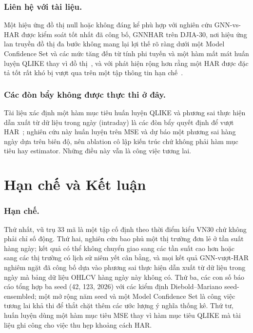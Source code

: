 \documentclass[runningheads]{llncs}
\begin{document}
\subsubsection{Liên hệ với tài liệu.}
Một hiệu ứng đồ thị null hoặc không đáng kể phù hợp với nghiên cứu GNN-vs-HAR được kiểm soát tốt nhất đã
công bố, GNNHAR trên DJIA-30, nơi hiệu ứng lan truyền đồ thị đa bước không mang lại lợi thế rõ ràng dưới
một Model Confidence Set và các mức tăng đến từ tính phi tuyến và một hàm mất mát huấn luyện QLIKE thay vì
đồ thị~\cite{zhang2025gnnhar}, và với phát hiện rộng hơn rằng một HAR được đặc tả tốt rất khó bị vượt qua
trên một tập thông tin hạn chế~\cite{audrino2025}.

\subsubsection{Các đòn bẩy không được thực thi ở đây.}
Tài liệu xác định một hàm mục tiêu huấn luyện QLIKE và phương sai thực hiện dẫn xuất từ dữ liệu trong ngày
(intraday) là các đòn bẩy quyết định để vượt HAR~\cite{zhang2025gnnhar}; nghiên cứu này huấn luyện trên
MSE và dự báo một phương sai hàng ngày dựa trên biên độ, nên ablation cô lập kiến trúc chứ không phải hàm
mục tiêu hay estimator. Những điều này vẫn là công việc tương lai.

\section{Hạn chế và Kết luận}
\label{sec:conclusion}

\subsubsection{Hạn chế.}
Thứ nhất, vũ trụ 33 mã là một tập cố định theo thời điểm kiểu VN30 chứ không phải chỉ số động. Thứ hai,
nghiên cứu bao phủ một thị trường đơn lẻ ở tần suất hàng ngày; kết quả có thể không chuyển giao sang các
tần suất cao hơn hoặc sang các thị trường có lịch sử niêm yết cân bằng, và mọi kết quả GNN-vượt-HAR
nghiêm ngặt đã công bố dựa vào phương sai thực hiện dẫn xuất từ dữ liệu trong ngày mà bảng dữ liệu OHLCV
hàng ngày này không có. Thứ ba, các con số báo cáo tổng hợp ba seed (42, 123, 2026) với các kiểm định
Diebold--Mariano seed-ensembled; một mở rộng năm seed và một Model Confidence Set là công việc tương lai
khả thi để thắt chặt thêm các ước lượng ý nghĩa thống kê. Thứ tư, huấn luyện dùng một hàm mục tiêu MSE
thay vì hàm mục tiêu QLIKE mà tài liệu ghi công cho việc thu hẹp khoảng cách HAR.
\end{document}
